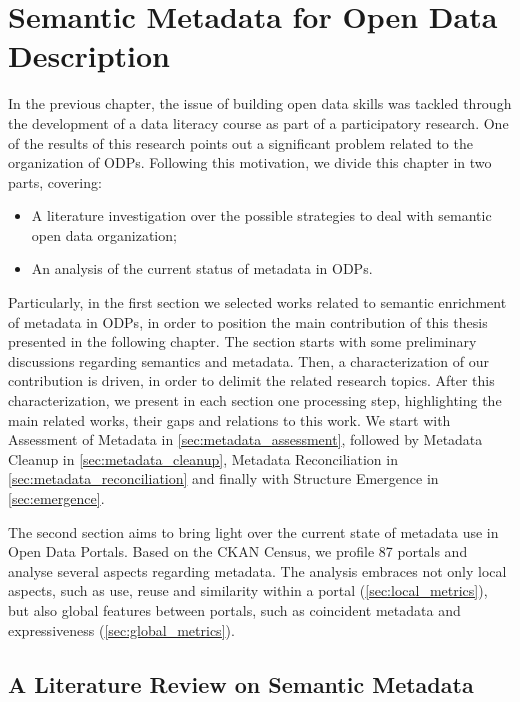 \chapter{Semantic Metadata for Open Data Description}
\label{chap:relworks}

In the previous chapter, the issue of building open data skills was tackled through the development of a data literacy course as part of a participatory research.
One of the results of this research points out a significant problem related to the organization of ODPs.
Following this motivation, we divide this chapter in two parts, covering:

\begin{itemize}
	\item A literature investigation over the possible strategies to deal with semantic open data organization;
	\item An analysis of the current status of metadata in ODPs.
\end{itemize}

Particularly, in the first section we selected works related to semantic enrichment of metadata in ODPs, in order to position the main contribution of this thesis presented in the following chapter.
The section starts with some preliminary discussions regarding semantics and metadata.
Then, a characterization of our contribution is driven, in order to delimit the related research topics.
After this characterization, we present in each section one processing step, highlighting the main related works, their gaps and relations to this work.
We start with Assessment of Metadata in \autoref{sec:metadata_assessment}, followed by Metadata Cleanup in \autoref{sec:metadata_cleanup}, Metadata Reconciliation in \autoref{sec:metadata_reconciliation} and finally with Structure Emergence in \autoref{sec:emergence}.

The second section aims to bring light over the current state of metadata use in Open Data Portals.
Based on the CKAN Census, we profile 87 portals and analyse several aspects regarding metadata.
The analysis embraces not only local aspects, such as use, reuse and similarity within a portal (\autoref{sec:local_metrics}), but also global features between portals, such as coincident metadata and expressiveness (\autoref{sec:global_metrics}).

\section{A Literature Review on Semantic Metadata}

